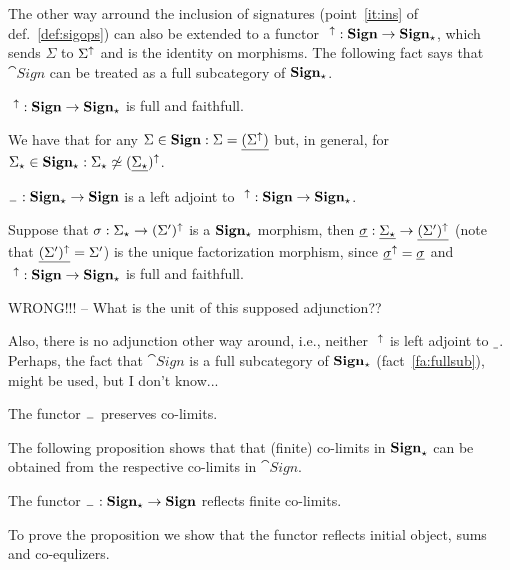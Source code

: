 The other way arround the inclusion of signatures (point~\ref{it:ins} of
def.~\ref{def:sigops}) can also be extended to a
functor $\fu{\ins\ }:\cat{Sign} \to \cat{Sign_\cons}$, which sends $\Sigma$
to $\Sigma^\uparrow$ and is the identity on morphisms. The following fact says
that $\cat{Sign}$ can be treated as a full subcategory of ${\bf Sign_\star}$.

\begin{fact}\label{fa:fullsub}
$\ins\ :\cat{Sign} \to \cat{Sign_\cons}$ is full and faithfull.
\end{fact}
We have that for any $\Sigma\in{\bf Sign}:\Sigma=\underline{(\Sigma^\uparrow)}$ but,
in general, for $\Sigma_\star\in{\bf Sign_\star}: \Sigma_\star\not\mathrel{\simeq} (\underline{\Sigma_\star})^\uparrow$.
\begin{lemma}
${\sf {_-}}:{\bf Sign_\star} \to {\bf Sign}$ is a left adjoint to $\ins\ :\cat{Sign} \to \cat{Sign_\cons}$.
\end{lemma}
\begin{PROOF}
Suppose that $\sigma: \Sigma_\star \to (\Sigma')^\uparrow$ is a
${\bf Sign_\star}$ morphism, then $\underline{\sigma}: \underline{\Sigma_\star} \to
\underline{(\Sigma')^\uparrow}$ (note that $\underline{(\Sigma')^\uparrow} = \Sigma'$) is
the unique factorization morphism, since $\underline{\sigma}^\uparrow=
\underline{\sigma}$ and $\ins\ :\cat{Sign} \to \cat{Sign_\cons}$ is full and
faithfull. 

{\Large{WRONG!!!}} -- 
What is the unit of this supposed adjunction?? 
\end{PROOF}
{\Large{Also}}, there is no adjunction other way around, i.e., neither
$\ ^\uparrow$ is left adjoint to $\underline{\ }$.
Perhaps, the fact that $\cat{Sign}$ is a full subcategory of
${\bf Sign_\star}$ (fact~\ref{fa:fullsub}), might be used, but I don't know...

\begin{corollary}
The functor ${\sf {_-}}$ preserves co-limits.
\end{corollary}
%
The following proposition shows that
 that (finite) co-limits in ${\bf Sign}_\star$
can be obtained from the respective co-limits in $\cat{Sign}$. 

\begin{proposition}\label{prop:finco}
The functor ${\sf {_-}}:{\bf Sign_\star} \to {\bf Sign}$ reflects finite co-limits.
\end{proposition}
%
To prove the proposition we show that the functor reflects initial object, sums and co-equlizers.

